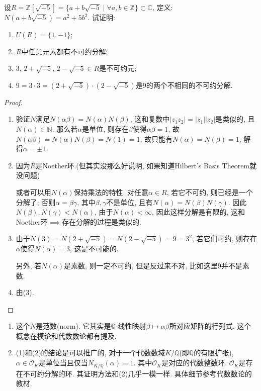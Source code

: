 \documentclass{../solutions-cn}
\begin{document}
\begin{exercise}[习题2.2.5]
    设$R = \mathbb{Z}[\sqrt{-5}] = \{a + b\sqrt{-5} \mid \forall a, b \in\mathbb{Z}\} \subset \mathbb{C}$,
定义: $N(a + b\sqrt{-5}) = a^2 + 5b^2$. 试证明: 
\begin{enumerate}[(1)]
    \item $U(R) = \{1, -1\}$;
    \item $R$中任意元素都有不可约分解;
    \item $3$, $2 + \sqrt{-5}$, $2 - \sqrt{-5} \in R$是不可约元;
    \item $9 = 3 \cdot 3= (2 + \sqrt{-5}) \cdot (2 - \sqrt{-5})$是$9$的两个不相同的不可约分解.
\end{enumerate}
\end{exercise}

\begin{proof}
\begin{enumerate}[(1)]
    \item 验证$N$满足$N(\alpha\beta) = N(\alpha)N(\beta)$, 这和复数中$|z_1z_2| = |z_1||z_2|$是类似的, 且$N(\alpha) \in \mathbb{N}$. 那么若$\alpha$是单位, 则存在$\beta$使得$\alpha\beta = 1$, 故$N(\alpha\beta) = N(\alpha)N(\beta) = N(1) = 1$, 故只能有$N(\alpha) = N(\beta) = 1$, 解得$\alpha = \pm 1$.
    \item 因为$R$是Noether环.(但其实没那么好说明, 如果知道Hilbert's Basis Theorem就没问题)
    
    或者可以用$N(\alpha)$保持乘法的特性. 对任意$\alpha \in R$, 若它不可约, 则已经是一个分解了; 否则$\alpha = \beta\gamma$, 其中$\beta, \gamma$不是单位, 且有$N(\alpha) = N(\beta)N(\gamma)$. 因此$N(\beta), N(\gamma) < N(\alpha)$, 由于$N(\alpha) < \infty$, 因此这样分解是有限的, 这和Noether环$\implies$存在分解的过程是类似的.
    \item 由于$N(3) = N(2 + \sqrt{-5}) = N(2 - \sqrt{-5}) = 9 = 3^2$, 若它们可约, 则存在$\alpha$使得$N(\alpha) = 3$, 这是不可能的.
    
    另外, 若$N(\alpha)$是素数, 则一定不可约, 但是反过来不对, 比如这里$9$并不是素数.
    \item 由(3).
\end{enumerate}
\end{proof}

\begin{remark}
    \begin{enumerate}[1.]
    \item 这个$N$是范数(norm). 它其实是$\mathbb{Q}$-线性映射$\beta \mapsto \alpha\beta$所对应矩阵的行列式. 这个概念在模论和代数数论都有提及.
    \item (1)和(2)的结论是可以推广的, 对于一个代数数域$K/\mathbb{Q}$(即$\mathbb{Q}$的有限扩张), $\alpha \in \mathcal{O}_K$是单位当且仅当$N_{K/\mathbb{Q}}(\alpha) = 1$. 其中$\mathcal{O}_K$是对应的代数整数环. $\mathcal{O}_K$是存在不可约分解的环. 其证明方法和(2)几乎一模一样. 具体细节参考代数数论的教材.
\end{enumerate}
\end{remark}
\end{document}
